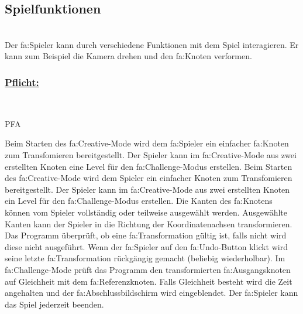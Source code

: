 %
%


\subsection{Spielfunktionen}

%
%
\renewcommand{\K}{}
%
%

~\\
Der \gls{fa:Spieler} kann durch verschiedene Funktionen mit dem Spiel interagieren. Er kann zum Beispiel die Kamera drehen und den \gls{fa:Knoten} verformen. 
\\

%
%
\subsubsection*{\underline{Pflicht:}}~\\

\begin{ids}{\gls{PFA\K}}

	\id[ 90] Beim Starten des \gls{fa:Creative}-Mode wird dem \gls{fa:Spieler} ein einfacher \gls{fa:Knoten} zum Transfomieren bereitgestellt.
 	\id[100] Der Spieler kann im \gls{fa:Creative}-Mode aus zwei erstellten Knoten eine Level für den \gls{fa:Challenge}-Modus erstellen.
 	\id[ 110] Beim Starten des \gls{fa:Creative}-Mode wird dem Spieler ein einfacher Knoten  zum Transfomieren bereitgestellt.
 	\id[ 120] Der Spieler kann im \gls{fa:Creative}-Mode aus zwei erstellten Knoten ein Level für den \gls{fa:Challenge}-Modus erstellen.
 	\id[ 130] Die Kanten des \gls{fa:Knoten}s können vom Spieler vollständig oder teilweise ausgewählt werden.
 	\id[ 140] Ausgewählte Kanten kann der Spieler in die Richtung der Koordinatenachsen transformieren.
 	\id[ 150] Das Programm überprüft, ob eine \gls{fa:Transformation} gültig ist, falls nicht wird diese nicht ausgeführt.
 	\id[ 160] Wenn der \gls{fa:Spieler} auf den \gls{fa:Undo}-Button klickt wird seine letzte \gls{fa:Transformation} rückgängig gemacht (beliebig wiederholbar). 
 	\id[ 170] Im \gls{fa:Challenge}-Mode prüft das Programm den transformierten \gls{fa:Ausgangsknoten} auf Gleichheit mit dem \gls{fa:Referenzknoten}. Falls Gleichheit besteht wird die Zeit angehalten und der \gls{fa:Abschlussbildschirm} wird eingeblendet.
 	\id[ 180] Der \gls{fa:Spieler} kann das Spiel jederzeit beenden.
 	
 	
 	
	
\end{ids}

